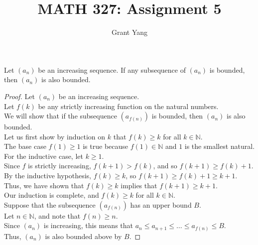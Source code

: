 \documentclass{article}
\newenvironment{theorem}[1]{\renewcommand\theinnercustomthm{#1}\innercustomthm}
  {\endinnercustomthm}
\begin{document}
\title{MATH 327: Assignment 5}
\author{Grant Yang}
\maketitle


\begin{theorem}1
Let $(a_n)$ be an increasing sequence. If any subsequence of $(a_n)$ is bounded, then $(a_n)$ is also bounded.
\end{theorem}
\begin{proof}
Let $(a_n)$ be an increasing sequence. \\ Let $f(k)$ be any strictly increasing function on the natural numbers. \\
We will show that if the subsequence $(a_{f(n)})$ is bounded, then $(a_n)$ is also bounded. \\
Let us first show by induction on $k$ that $f(k) \ge k$ for all $k \in \mathbb N$. \\
The base case $f(1)\ge 1$ is true because $f(1) \in \mathbb N$ and $1$ is the smallest natural. \\
For the inductive case, let $k\ge 1$. \\
Since $f$ is strictly increasing, $f(k+1)> f(k)$, and so $f(k+1) \ge f(k)+1$. \\
By the inductive hypothesis, $f(k) \ge k$, so  $f(k+1)\ge f(k)+1 \ge k + 1$. \\
Thus, we have shown that $f(k)\ge k$ implies that $f(k+1) \ge k+ 1$. \\
Our induction is complete, and $f(k) \ge k$ for all $k \in \mathbb N$. \\
Suppose that the subsequence $(a_{f(n)})$ has an upper bound $B$. \\
Let $n \in \mathbb N$, and note that $f(n) \ge n$. \\
Since $(a_n)$ is increasing, this means that $a_n \le a_{n+1} \le \dots \le a_{f(n)} \le B$. \\
Thus, $(a_n)$ is also bounded above by $B$.
\end{proof}
\end{document}
